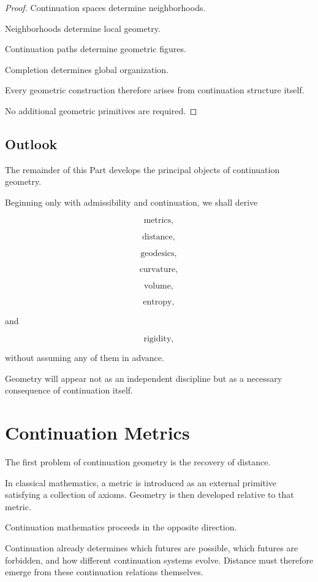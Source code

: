 \documentclass[13pt,openany]{book}
\theoremstyle{plain}
\theoremstyle{definition}
\begin{document}
\begin{proof}
Continuation spaces determine neighborhoods.

Neighborhoods determine local geometry.

Continuation paths determine geometric figures.

Completion determines global organization.

Every geometric construction therefore arises from continuation structure itself.

No additional geometric primitives are required.
\end{proof}


\section{Outlook}

The remainder of this Part develops the principal objects of continuation geometry.

Beginning only with admissibility and continuation, we shall derive

\[
\text{metrics},
\]

\[
\text{distance},
\]

\[
\text{geodesics},
\]

\[
\text{curvature},
\]

\[
\text{volume},
\]

\[
\text{entropy},
\]

and

\[
\text{rigidity},
\]

without assuming any of them in advance.

Geometry will appear not as an independent discipline but as a necessary consequence of continuation itself.

\chapter{Continuation Metrics}

The first problem of continuation geometry is the recovery of distance.

In classical mathematics, a metric is introduced as an external primitive satisfying a collection of axioms. Geometry is then developed relative to that metric.

Continuation mathematics proceeds in the opposite direction.

Continuation already determines which futures are possible, which futures are forbidden, and how different continuation systems evolve. Distance must therefore emerge from these continuation relations themselves.
\end{document}
